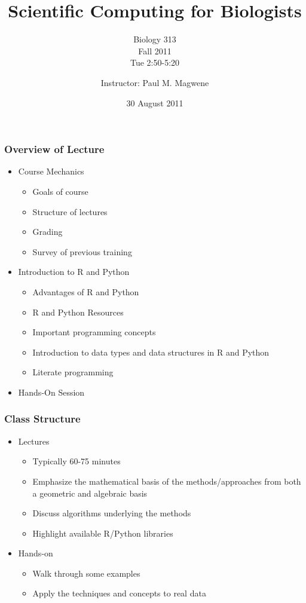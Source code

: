 \documentclass{beamer}
\title{Scientific Computing for Biologists}
\subtitle{Biology 313\\
Fall 2011\\
Tue 2:50-5:20
}
\author[P. Magwene]{Instructor: Paul M. Magwene}
\institute[Bio 313]{
Email: paul.magwene@duke.edu\\
Phone: 613-8159
}
\date{30 August 2011}
\begin{document}
\begin{frame}
\titlepage
\end{frame}

\begin{frame}
  \frametitle{Overview of Lecture}
  
\begin{itemize}
		\item Course Mechanics
		\begin{itemize}
			\item Goals of course
			\item Structure of lectures
			\item Grading
			\item Survey of previous training
		\end{itemize}
		\item Introduction to R and Python
		\begin{itemize}
			\item Advantages of R and Python
			\item R and Python Resources
			\item Important programming concepts
			\item Introduction to data types and data structures in R and Python
			\item Literate programming
		\end{itemize}
		\item Hands-On Session
\end{itemize}

\end{frame}


\begin{frame}
  \frametitle{Class Structure}
\begin{itemize}
	\item Lectures	
	
		\begin{itemize}
			\item Typically 60-75 minutes
			\item Emphasize the mathematical basis of the methods/approaches from both a geometric and algebraic basis
			\item Discuss algorithms underlying the methods
			\item Highlight available R/Python libraries
		\end{itemize}
		
	\item Hands-on
	
			\begin{itemize}
				\item Walk through some examples
				\item Apply the techniques and concepts to real data
			\end{itemize}
	
\end{itemize}

\end{frame}
\end{document}
